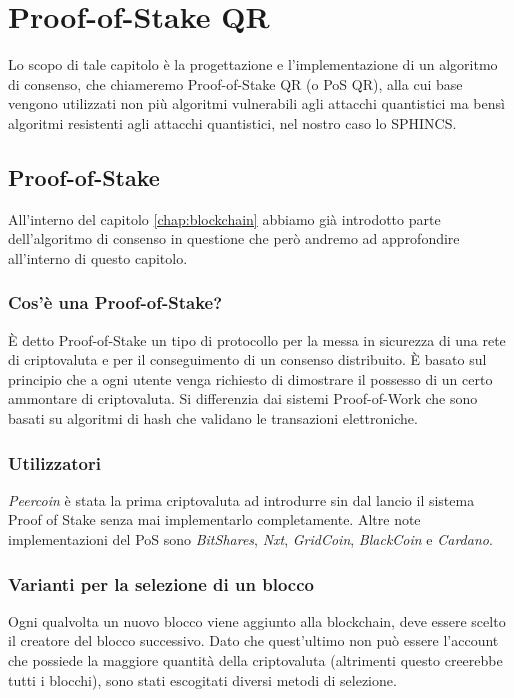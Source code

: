 \chapter{Proof-of-Stake QR}
Lo scopo di tale capitolo è la progettazione e l'implementazione di un algoritmo di consenso, che chiameremo Proof-of-Stake QR (o PoS QR), alla cui base vengono utilizzati non più algoritmi vulnerabili agli attacchi quantistici ma bensì algoritmi resistenti agli attacchi quantistici, nel nostro caso lo SPHINCS.

\section{Proof-of-Stake}
All'interno del capitolo \ref{chap:blockchain} abbiamo già introdotto parte dell'algoritmo di consenso in questione che però andremo ad approfondire all'interno di questo capitolo.

\subsection{Cos'è una Proof-of-Stake?}
È detto Proof-of-Stake un tipo di protocollo per la messa in sicurezza di una rete di criptovaluta e per il conseguimento di un consenso distribuito. È basato sul principio che a ogni utente venga richiesto di dimostrare il possesso di un certo ammontare di criptovaluta. Si differenzia dai sistemi Proof-of-Work che sono basati su algoritmi di hash che validano le transazioni elettroniche.

\subsection{Utilizzatori}
\textit{Peercoin} è stata la prima criptovaluta ad introdurre sin dal lancio il sistema Proof of Stake senza mai implementarlo completamente. Altre note implementazioni del PoS sono \textit{BitShares}, \textit{Nxt}, \textit{GridCoin}, \textit{BlackCoin} e \textit{Cardano}.

\subsection{Varianti per la selezione di un blocco}
Ogni qualvolta un nuovo blocco viene aggiunto alla blockchain, deve essere scelto il creatore del blocco successivo. Dato che quest'ultimo non può essere l'account che possiede la maggiore quantità della criptovaluta (altrimenti questo creerebbe tutti i blocchi), sono stati escogitati diversi metodi di selezione.

